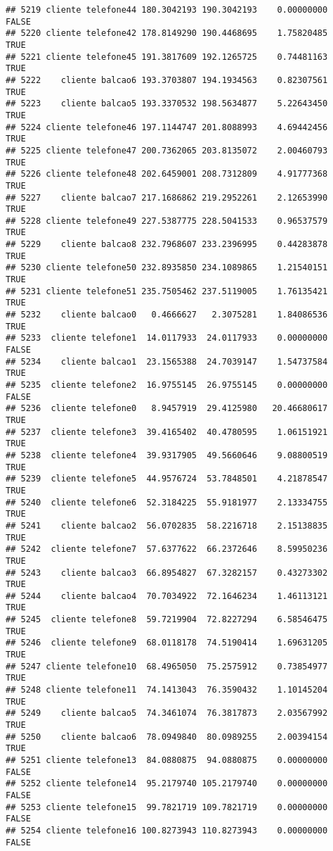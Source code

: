 \documentclass[
]{article}
\begin{document}
\begin{verbatim}
## 5219 cliente telefone44 180.3042193 190.3042193    0.00000000    FALSE
## 5220 cliente telefone42 178.8149290 190.4468695    1.75820485     TRUE
## 5221 cliente telefone45 191.3817609 192.1265725    0.74481163     TRUE
## 5222    cliente balcao6 193.3703807 194.1934563    0.82307561     TRUE
## 5223    cliente balcao5 193.3370532 198.5634877    5.22643450     TRUE
## 5224 cliente telefone46 197.1144747 201.8088993    4.69442456     TRUE
## 5225 cliente telefone47 200.7362065 203.8135072    2.00460793     TRUE
## 5226 cliente telefone48 202.6459001 208.7312809    4.91777368     TRUE
## 5227    cliente balcao7 217.1686862 219.2952261    2.12653990     TRUE
## 5228 cliente telefone49 227.5387775 228.5041533    0.96537579     TRUE
## 5229    cliente balcao8 232.7968607 233.2396995    0.44283878     TRUE
## 5230 cliente telefone50 232.8935850 234.1089865    1.21540151     TRUE
## 5231 cliente telefone51 235.7505462 237.5119005    1.76135421     TRUE
## 5232    cliente balcao0   0.4666627   2.3075281    1.84086536     TRUE
## 5233  cliente telefone1  14.0117933  24.0117933    0.00000000    FALSE
## 5234    cliente balcao1  23.1565388  24.7039147    1.54737584     TRUE
## 5235  cliente telefone2  16.9755145  26.9755145    0.00000000    FALSE
## 5236  cliente telefone0   8.9457919  29.4125980   20.46680617     TRUE
## 5237  cliente telefone3  39.4165402  40.4780595    1.06151921     TRUE
## 5238  cliente telefone4  39.9317905  49.5660646    9.08800519     TRUE
## 5239  cliente telefone5  44.9576724  53.7848501    4.21878547     TRUE
## 5240  cliente telefone6  52.3184225  55.9181977    2.13334755     TRUE
## 5241    cliente balcao2  56.0702835  58.2216718    2.15138835     TRUE
## 5242  cliente telefone7  57.6377622  66.2372646    8.59950236     TRUE
## 5243    cliente balcao3  66.8954827  67.3282157    0.43273302     TRUE
## 5244    cliente balcao4  70.7034922  72.1646234    1.46113121     TRUE
## 5245  cliente telefone8  59.7219904  72.8227294    6.58546475     TRUE
## 5246  cliente telefone9  68.0118178  74.5190414    1.69631205     TRUE
## 5247 cliente telefone10  68.4965050  75.2575912    0.73854977     TRUE
## 5248 cliente telefone11  74.1413043  76.3590432    1.10145204     TRUE
## 5249    cliente balcao5  74.3461074  76.3817873    2.03567992     TRUE
## 5250    cliente balcao6  78.0949840  80.0989255    2.00394154     TRUE
## 5251 cliente telefone13  84.0880875  94.0880875    0.00000000    FALSE
## 5252 cliente telefone14  95.2179740 105.2179740    0.00000000    FALSE
## 5253 cliente telefone15  99.7821719 109.7821719    0.00000000    FALSE
## 5254 cliente telefone16 100.8273943 110.8273943    0.00000000    FALSE

\end{verbatim}
\end{document}
